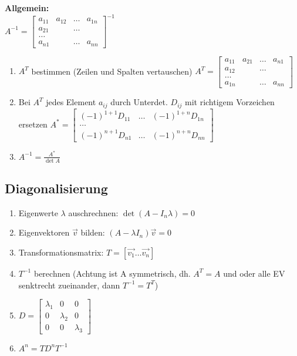 \textbf{Allgemein:}\\
	$A^{-1}= \begin{bmatrix}
    	a_{11} & a_{12}& \ldots & a_{1n}\\
    	a_{21}& &\ldots & \\
    	\ldots \\
    	a_{n1} & & \ldots & a_{nn}    			
    \end{bmatrix}^{-1}$
	\begin{enumerate}
		\item $A^T$ bestimmen (Zeilen und Spalten vertauschen) $A^{T}= \begin{bmatrix}
    	a_{11} & a_{21}& \ldots & a_{n1}\\
    	a_{12}& &\ldots & \\
    	\ldots \\
    	a_{1n} & & \ldots & a_{nn}    			
    \end{bmatrix}$	
		\item Bei $A^T$ jedes Element $a_{ij}$ durch Unterdet. $D_{ij}$ mit
		richtigem Vorzeichen ersetzen $A^*=	\begin{bmatrix}
			(-1)^{1+1}D_{11} &  \ldots	& (-1)^{1+n} D_{1n}\\
			\ldots\\
			(-1)^{n+1} D_{n1}& \ldots  & (-1)^{n+n} D_{nn}
		\end{bmatrix}$
		\item $A^{-1} = \frac{A^*}{\det A}$ 
    \end{enumerate}
 
 \subsection{Diagonalisierung}
 	\begin{enumerate}
       \item Eigenwerte $\lambda$ auschrechnen: $\det (A - I_n \lambda)=0$
       \item Eigenvektoren $\vec{v}$ bilden: $(A- \lambda I_n)\vec{v}=0$
       \item Transformationsmatrix: $T= [\vec{v_1} \ldots \vec{v_n}]$
       \item $T^{-1}$ berechnen (Achtung ist A symmetrisch, dh. $A^T=A$ und
       oder alle EV senktrecht zueinander, dann $T^{-1}=T^T$)
       \item $D=\begin{bmatrix}
                	\lambda_1 &0 &0\\
                	0& \lambda_2 &0\\
                	0& 0& \lambda_3
                \end{bmatrix}$
		\item $A^n = T D^n T^{-1}$

     \end{enumerate}
